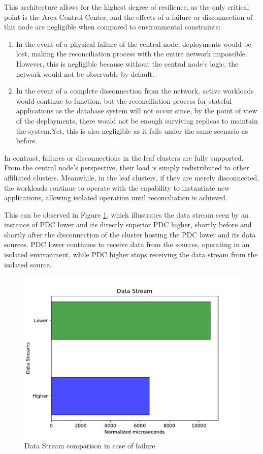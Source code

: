 This architecture allows for the highest degree of resilience, as the only critical point is the Area Control Center, and the effects of a failure or disconnection of this node are negligible when compared to environmental constraints:
\begin{enumerate}
\item In the event of a physical failure of the central node, deployments would be lost, making the reconciliation process with the entire network impossible. However, this is negligible because without the central node's logic, the network would not be observable by default.
\item In the event of a complete disconnection from the network, active workloads would continue to function, but the reconciliation process for stateful applications as the database system will not occur since, by the point of view of the deployments, there would not be enough surviving replicas to maintain the system.Yet, this is also negligible as it falls under the same scenario as before.
\end{enumerate}

In contrast, failures or disconnections in the leaf clusters are fully supported. From the central node's perspective, their load is simply redistributed to other affiliated clusters. Meanwhile, in the leaf clusters, if they are merely disconnected, the workloads continue to operate with the capability to instantiate new applications, allowing isolated operation until reconciliation is achieved.

This can be observed in Figure \ref{fig:stream}, which illustrates the data stream seen by an instance of PDC lower and its directly superior PDC higher, shortly before and shortly after the disconnection of the cluster hosting the PDC lower and its data sources. PDC lower continues to receive data from the sources, operating in an isolated environment, while PDC higher stops receiving the data stream from the isolated source.

\begin{figure}[ht]\centering
\includegraphics[scale=0.5]{Pictures/data-stream}
\caption{Data Stream comparison in case of failure}\label{fig:stream}
\end{figure}


